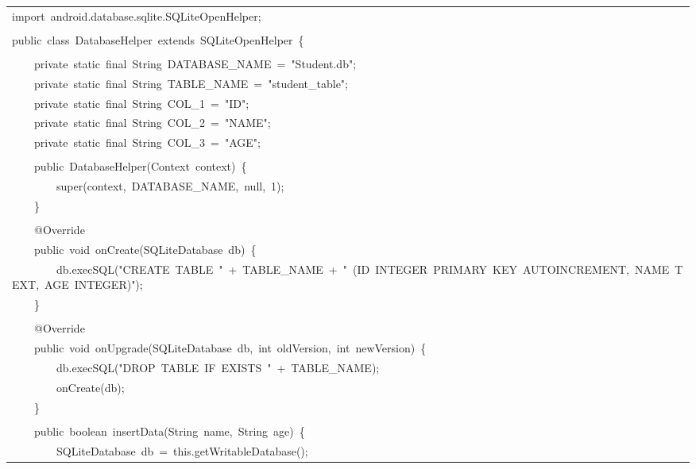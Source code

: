 \documentclass[a4paper,12pt]{article}
\begin{document}
\begin{longtable}{|p{}|}
{\ttfamily\small import\ android.database.sqlite.SQLiteOpenHelper;} \\
\strut \\
{\ttfamily\small public\ class\ DatabaseHelper\ extends\ SQLiteOpenHelper\ \{} \\
\strut \\
{\ttfamily\small \ \ \ \ private\ static\ final\ String\ DATABASE\_NAME\ =\ "Student.db";} \\
{\ttfamily\small \ \ \ \ private\ static\ final\ String\ TABLE\_NAME\ =\ "student\_table";} \\
{\ttfamily\small \ \ \ \ private\ static\ final\ String\ COL\_1\ =\ "ID";} \\
{\ttfamily\small \ \ \ \ private\ static\ final\ String\ COL\_2\ =\ "NAME";} \\
{\ttfamily\small \ \ \ \ private\ static\ final\ String\ COL\_3\ =\ "AGE";} \\
\strut \\
{\ttfamily\small \ \ \ \ public\ DatabaseHelper(Context\ context)\ \{} \\
{\ttfamily\small \ \ \ \ \ \ \ \ super(context,\ DATABASE\_NAME,\ null,\ 1);} \\
{\ttfamily\small \ \ \ \ \}} \\
\strut \\
{\ttfamily\small \ \ \ \ @Override} \\
{\ttfamily\small \ \ \ \ public\ void\ onCreate(SQLiteDatabase\ db)\ \{} \\
{\ttfamily\small \ \ \ \ \ \ \ \ db.execSQL("CREATE\ TABLE\ "\ +\ TABLE\_NAME\ +\ "\ (ID\ INTEGER\ PRIMARY\ KEY\ AUTOINCREMENT,\ NAME\ TEXT,\ AGE\ INTEGER)");} \\
{\ttfamily\small \ \ \ \ \}} \\
\strut \\
{\ttfamily\small \ \ \ \ @Override} \\
{\ttfamily\small \ \ \ \ public\ void\ onUpgrade(SQLiteDatabase\ db,\ int\ oldVersion,\ int\ newVersion)\ \{} \\
{\ttfamily\small \ \ \ \ \ \ \ \ db.execSQL("DROP\ TABLE\ IF\ EXISTS\ "\ +\ TABLE\_NAME);} \\
{\ttfamily\small \ \ \ \ \ \ \ \ onCreate(db);} \\
{\ttfamily\small \ \ \ \ \}} \\
\strut \\
{\ttfamily\small \ \ \ \ public\ boolean\ insertData(String\ name,\ String\ age)\ \{} \\
{\ttfamily\small \ \ \ \ \ \ \ \ SQLiteDatabase\ db\ =\ this.getWritableDatabase();} \\

\end{longtable}
\end{document}
